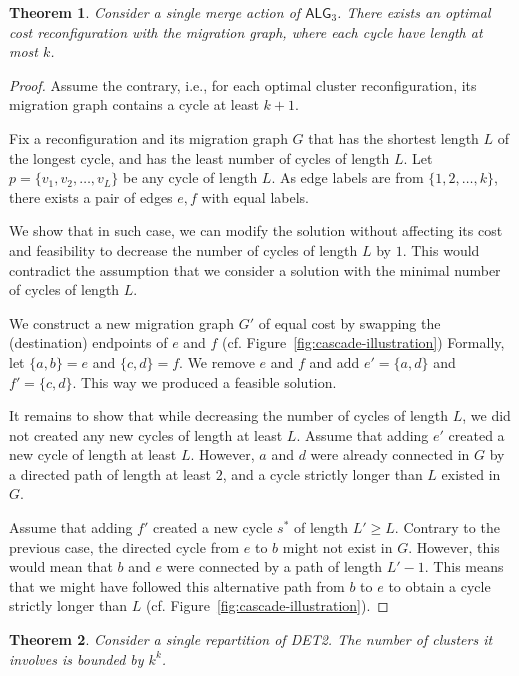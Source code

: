 \documentclass[]{article}
\newcommand{\TAlg}{{\ensuremath{\textsf{ALG}_{3}}}\xspace}
\newtheorem{theorem}{Theorem}
\begin{document}
\begin{theorem}
	\label{th:cascade-cycles}
	Consider a single merge action of \TAlg.
	There exists an optimal cost reconfiguration with the migration graph, where each cycle have length at most $k$.
\end{theorem}

\begin{proof}
	Assume the contrary, i.e., for each optimal cluster reconfiguration, its migration graph contains a cycle at least $k+1$.
	
	Fix a reconfiguration and its migration graph $G$ that has the shortest length $L$ of the longest cycle, and has the least number of cycles of length $L$.
	Let $p = \lbrace v_1, v_2, \ldots, v_L \rbrace$ be any cycle of length $L$.
	As edge labels are from $\{ 1, 2, \ldots, k \}$, there exists a pair of edges $e, f$ with equal labels.
	
	We show that in such case, we can modify the solution without affecting its cost and feasibility to decrease the number of cycles of length $L$ by $1$.
	This would contradict the assumption that we consider a solution with the minimal number of cycles of length $L$.
	
	We construct a new migration graph $G'$ of equal cost by swapping the (destination) endpoints of $e$ and $f$ (cf. Figure~\ref{fig:cascade-illustration})
	Formally, let $\lbrace a, b \rbrace = e$ and $\lbrace c, d \rbrace = f$.
	We remove $e$ and $f$ and add $e' = \lbrace a, d \rbrace$ and $f' = \lbrace c, d \rbrace$.
	This way we produced a feasible solution.
	
	It remains to show that while decreasing the number of cycles of length $L$, we did not created any new cycles of length at least $L$.
	Assume that adding $e'$ created a new cycle of length at least $L$.
	However, $a$ and $d$ were already connected in $G$ by a directed path of length at least $2$, and a cycle strictly longer than $L$ existed in $G$.
	
	Assume that adding $f'$ created a new cycle $s^*$ of length $L' \geq L$.
	Contrary to the previous case, the directed cycle from $e$ to $b$ might not exist in $G$.
	However, this would mean that $b$ and $e$ were connected by a path of length $L'-1$.
	This means that we might have followed this alternative path from $b$ to $e$ to obtain a cycle strictly longer than $L$ (cf. Figure~\ref{fig:cascade-illustration}).
	
\end{proof}


\begin{theorem}
	Consider a single repartition of DET2.
	The number of clusters it involves is bounded by $k^k$.
	\label{th:cascade}
\end{theorem}
\end{document}
